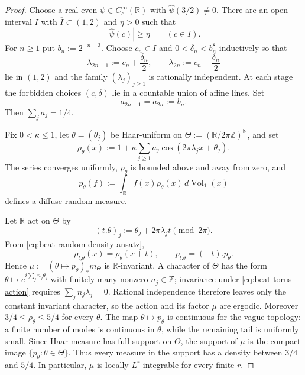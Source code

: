 \documentclass[11pt,reqno,a4paper]{amsart}
\numberwithin{equation}{section}
\theoremstyle{compact}
\theoremstyle{definition}
\theoremstyle{definition}
\newcommand{\Vol}{\operatorname{Vol}}
\begin{document}
\begin{proof}
Choose a real even $\psi\in C_c^\infty(\mathbb R)$ with
$\widehat\psi(3/2)\neq0$.  There are an open interval $I$ with
$\overline I\subset(1,2)$ and $\eta>0$ such that
\begin{equation}\label{eq:beat-test-lower-bound}
  |\widehat\psi(c)|\geq\eta
  \qquad(c\in I).
\end{equation}
For $n\geq1$ put $b_n:=2^{-n-3}$.  Choose $c_n\in I$ and
$0<\delta_n<b_n^8$ inductively so that
\begin{equation}\label{eq:beat-frequency-pairs}
  \lambda_{2n-1}:=c_n+\frac{\delta_n}{2},
  \qquad
  \lambda_{2n}:=c_n-\frac{\delta_n}{2}
\end{equation}
lie in $(1,2)$ and the family $(\lambda_j)_{j\geq1}$ is rationally
independent.  At each stage the forbidden choices $(c,\delta)$ lie in a
countable union of affine lines.  Set
\begin{equation}\label{eq:beat-amplitudes}
  a_{2n-1}=a_{2n}:=b_n.
\end{equation}
Then $\sum_j a_j=1/4$.

Fix $0<\kappa\leq1$, let $\theta=(\theta_j)$ be Haar-uniform on
$\Theta:=(\mathbb R/2\pi\mathbb Z)^{\mathbb N}$, and set
\begin{equation}\label{eq:beat-random-density-ansatz}
  \rho_\theta(x)
  :=1+\kappa\sum_{j\geq1}a_j
       \cos(2\pi\lambda_jx+\theta_j).
\end{equation}
The series converges uniformly, $\rho_\theta$ is bounded above and away
from zero, and
\begin{equation}\label{eq:beat-random-measure}
  p_\theta(f):=\int_{\mathbb R}f(x)\rho_\theta(x)\,d\Vol_1(x)
\end{equation}
defines a diffuse random measure.

Let $\mathbb R$ act on $\Theta$ by
\begin{equation}\label{eq:beat-torus-action}
  (t.\theta)_j:=\theta_j+2\pi\lambda_jt\pmod{2\pi}.
\end{equation}
From \eqref{eq:beat-random-density-ansatz},
\[
  \rho_{t.\theta}(x)=\rho_\theta(x+t),
  \qquad
  p_{t.\theta}=(-t).p_\theta.
\]
Hence $\mu:=(\theta\mapsto p_\theta)_*m_\Theta$ is $\mathbb R$-invariant.  A
character of $\Theta$ has the form
$\theta\mapsto e^{i\sum_j n_j\theta_j}$ with finitely many nonzero
$n_j\in\mathbb Z$; invariance under \eqref{eq:beat-torus-action} requires
$\sum_jn_j\lambda_j=0$.  Rational independence therefore leaves only the
constant invariant character, so the action and its factor $\mu$ are
ergodic.
Moreover $3/4\leq\rho_\theta\leq5/4$ for every $\theta$.  The map
$\theta\mapsto p_\theta$ is continuous for the vague topology: a finite
number of modes is continuous in $\theta$, while the remaining tail is
uniformly small.  Since Haar measure has full support on $\Theta$, the
support of $\mu$ is the compact image $\{p_\theta:\theta\in\Theta\}$.
Thus every measure in the support has a density between $3/4$ and $5/4$.
In particular, $\mu$ is locally $L^r$-integrable for every finite $r$.


\end{proof}
\end{document}
